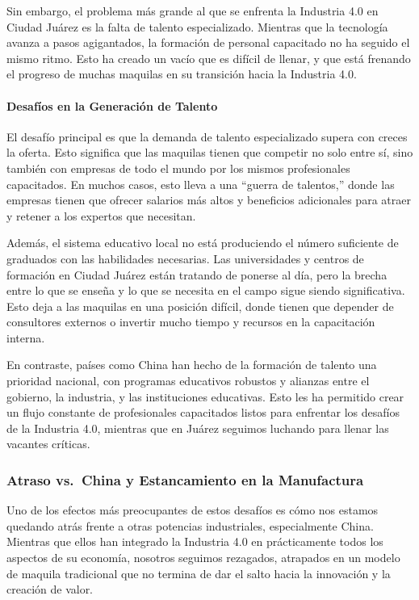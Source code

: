 \documentclass[
  10pt,
  letterpaper,
]{book}
\let\oldparagraph\paragraph
\renewcommand{\paragraph}[1]{\oldparagraph{#1}\mbox{}}
\begin{document}
Sin embargo, el problema más grande al que se enfrenta la Industria 4.0
en Ciudad Juárez es la falta de talento especializado. Mientras que la
tecnología avanza a pasos agigantados, la formación de personal
capacitado no ha seguido el mismo ritmo. Esto ha creado un vacío que es
difícil de llenar, y que está frenando el progreso de muchas maquilas en
su transición hacia la Industria 4.0.

\paragraph{Desafíos en la Generación de
Talento}\label{desafuxedos-en-la-generaciuxf3n-de-talento}

El desafío principal es que la demanda de talento especializado supera
con creces la oferta. Esto significa que las maquilas tienen que
competir no solo entre sí, sino también con empresas de todo el mundo
por los mismos profesionales capacitados. En muchos casos, esto lleva a
una ``guerra de talentos,'' donde las empresas tienen que ofrecer
salarios más altos y beneficios adicionales para atraer y retener a los
expertos que necesitan.

Además, el sistema educativo local no está produciendo el número
suficiente de graduados con las habilidades necesarias. Las
universidades y centros de formación en Ciudad Juárez están tratando de
ponerse al día, pero la brecha entre lo que se enseña y lo que se
necesita en el campo sigue siendo significativa. Esto deja a las
maquilas en una posición difícil, donde tienen que depender de
consultores externos o invertir mucho tiempo y recursos en la
capacitación interna.

En contraste, países como China han hecho de la formación de talento una
prioridad nacional, con programas educativos robustos y alianzas entre
el gobierno, la industria, y las instituciones educativas. Esto les ha
permitido crear un flujo constante de profesionales capacitados listos
para enfrentar los desafíos de la Industria 4.0, mientras que en Juárez
seguimos luchando para llenar las vacantes críticas.

\subsubsection{Atraso vs.~China y Estancamiento en la
Manufactura}\label{atraso-vs.-china-y-estancamiento-en-la-manufactura}

Uno de los efectos más preocupantes de estos desafíos es cómo nos
estamos quedando atrás frente a otras potencias industriales,
especialmente China. Mientras que ellos han integrado la Industria 4.0
en prácticamente todos los aspectos de su economía, nosotros seguimos
rezagados, atrapados en un modelo de maquila tradicional que no termina
de dar el salto hacia la innovación y la creación de valor.
\end{document}

